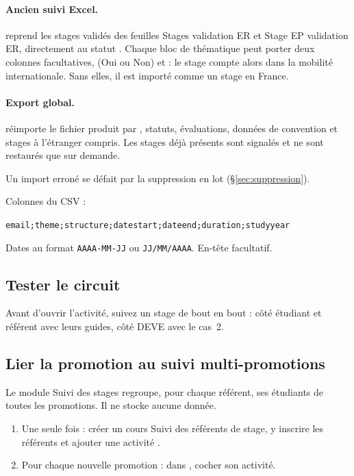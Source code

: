 \documentclass[11pt,a4paper]{article}
\begin{document}
\paragraph{Ancien suivi Excel.}  reprend
les stages validés des feuilles \og Stages validation ER\fg{} et \og Stage EP
validation ER\fg{}, directement au statut . Chaque bloc de
thématique peut porter deux colonnes facultatives, 
(Oui ou Non) et  : le stage compte alors dans la mobilité
internationale. Sans elles, il est importé comme un stage en France.

\paragraph{Export global.}  réimporte le
fichier produit par , statuts, évaluations, données de
convention et stages à l'étranger compris. Les stages déjà présents sont
signalés et ne sont restaurés que sur demande.

Un import erroné se défait par la suppression en lot (§\ref{sec:suppression}).

Colonnes du CSV :
\begin{center}
\texttt{email;theme;structure;datestart;dateend;duration;studyyear}
\end{center}
Dates au format \texttt{AAAA-MM-JJ} ou \texttt{JJ/MM/AAAA}. En-tête facultatif.


\subsection{Tester le circuit}
\label{sec:verification}

Avant d'ouvrir l'activité, suivez un stage de bout en bout : côté étudiant et
référent avec leurs guides, côté DEVE avec le cas~2.

\subsection{Lier la promotion au suivi multi-promotions}

Le module \og Suivi des stages\fg{} regroupe, pour chaque référent, ses étudiants
de toutes les promotions. Il ne stocke aucune donnée.

\begin{enumerate}
  \item Une seule fois : créer un cours \og Suivi des référents de stage\fg{},
        y inscrire les référents et ajouter une activité .
  \item Pour chaque nouvelle promotion : dans , cocher
        son activité.
\end{enumerate}
\end{document}
